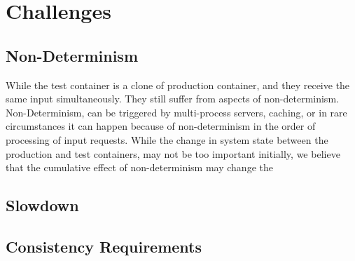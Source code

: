 \section{Challenges}
\label{sec:challenges}

\subsection{Non-Determinism}
\label{sec:nonDeterminism}

While the test container is a clone of production container, and they receive the same input simultaneously. 
They still suffer from aspects of non-determinism.
Non-Determinism, can be triggered by multi-process servers, caching, or in rare circumstances it can happen because of non-determinism in the order of processing of input requests. 
While the change in system state between the production and test containers, may not be too important initially, we believe that the cumulative effect of non-determinism may change the 

\subsection{Slowdown}
\label{sec:slowdown}

\subsection{Consistency Requirements}
\label{sec:consistency}
